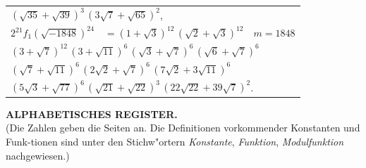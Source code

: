 \documentclass[12pt,a4paper]{article}
\begin{document}
\begin{longtable}{@{}llr@{}}
\multicolumn{3}{l}{\qquad$(\sqrt{35}+\sqrt{39})^3\,(3\sqrt{7}+\sqrt{65})^2$,} \\
$2^{21}f_1(\sqrt{-1848})^{24}$ &$= (1+\sqrt{3})^{12}\,(\sqrt{2}+\sqrt{3})^{12}$ & $m=1848$ \\
\multicolumn{3}{l}{\qquad$(3+\sqrt{7})^{12}\,(3+\sqrt{11})^6\,(\sqrt{3}+\sqrt{7})^6\,(\sqrt{6}+\sqrt{7})^6$} \\
\multicolumn{3}{l}{\qquad$(\sqrt{7}+\sqrt{11})^6\,(2\sqrt{2}+\sqrt{7})^6\,(7\sqrt{2}+3\sqrt{11})^6$} \\
\multicolumn{3}{l}{\qquad$(5\sqrt{3}+\sqrt{77})^6\,(\sqrt{21}+\sqrt{22})^3\,(22\sqrt{22}+39\sqrt{7})^2$.} \\
\bottomrule
\end{longtable}

\newpage
\setcounter{page}{727}

\begin{center}
\Large\textbf{ALPHABETISCHES REGISTER.}\\[6pt]
\small
(Die Zahlen geben die Seiten an. Die Definitionen vorkommender Konstanten und Funk{-}tionen sind unter den Stichw"ortern \textit{Konstante}, \textit{Funktion}, \textit{Modulfunktion} nachgewiesen.)
\end{center}

\medskip
\end{document}
